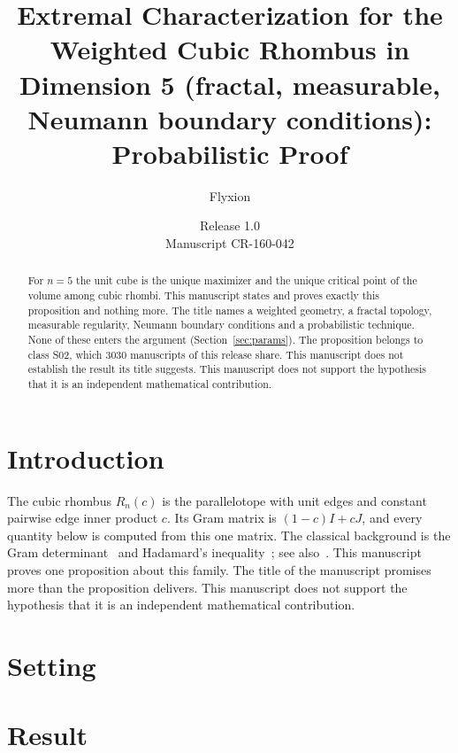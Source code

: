 \documentclass[11pt]{article}
\title{Extremal Characterization for the Weighted Cubic Rhombus in Dimension 5 (fractal, measurable, Neumann boundary conditions): Probabilistic Proof}
\author{Flyxion}
\date{Release 1.0\\ Manuscript CR-160-042}
\begin{document}
\maketitle
\begin{abstract}
For $n=5$ the unit cube is the unique maximizer and the unique critical point of the volume among cubic rhombi. This manuscript states and proves exactly this proposition and nothing more. The title names a weighted geometry, a fractal topology, measurable regularity, Neumann boundary conditions and a probabilistic technique. None of these enters the argument (Section~\ref{sec:params}). The proposition belongs to class S02, which 3030 manuscripts of this release share. This manuscript does not establish the result its title suggests. This manuscript does not support the hypothesis that it is an independent mathematical contribution.
\end{abstract}

\section{Introduction}
The cubic rhombus $R_n(c)$ is the parallelotope with unit edges and constant pairwise edge inner product $c$. Its Gram matrix is $(1-c)I+cJ$, and every quantity below is computed from this one matrix. The classical background is the Gram determinant~\cite{gram} and Hadamard's inequality~\cite{hadamard}; see also~\cite{hj}.
This manuscript proves one proposition about this family. The title of the manuscript promises more than the proposition delivers. This manuscript does not support the hypothesis that it is an independent mathematical contribution.

\section{Setting}


\section{Result}

\end{document}
